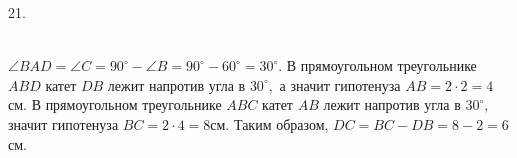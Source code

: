 21. \begin{figure}[ht!]
\end{figure}\\
$\angle BAD=\angle C=90^\circ-\angle B=90^\circ-60^\circ=30^\circ.$ В прямоугольном треугольнике $ABD$ катет $DB$ лежит напротив угла в $30^\circ,$ а значит гипотенуза $AB=2\cdot2=4$см. В прямоугольном треугольнике $ABC$ катет $AB$ лежит напротив угла в $30^\circ,$ значит гипотенуза $BC=2\cdot4=8$см. Таким образом, $DC=BC-DB=8-2=6$см.\\
